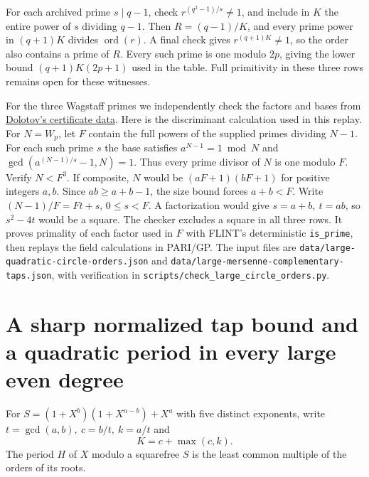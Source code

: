 \documentclass[11pt]{article}
\begin{document}
For each archived prime \(s\mid q-1\), check
\(r^{(q^2-1)/s}\ne1\), and include in \(K\) the entire power of \(s\)
dividing \(q-1\). Then \(R=(q-1)/K\), and every prime power in
\((q+1)K\) divides \(\operatorname{ord}(r)\). A final check gives
\(r^{(q+1)K}\ne1\), so the order also contains a prime of \(R\).
Every such prime is one modulo \(2p\), giving the lower bound
\((q+1)K(2p+1)\) used in the table. Full primitivity in these
three rows remains open for these witnesses.

For the three Wagstaff primes we independently check the factors
and bases from \href{https://doi.org/10.5281/zenodo.19645478}{Dolotov's
certificate data}. Here is the discriminant calculation used in
this replay. For \(N=W_p\), let \(F\) contain the full powers of
the supplied primes dividing \(N-1\). For each such prime \(s\)
the base satisfies \(a^{N-1}=1\bmod N\) and
\(\gcd(a^{(N-1)/s}-1,N)=1\). Thus every prime divisor of \(N\)
is one modulo \(F\). Verify \(N<F^3\). If composite, \(N\)
would be \((aF+1)(bF+1)\) for positive integers \(a,b\).
Since \(ab\ge a+b-1\), the size bound forces \(a+b<F\).
Write \((N-1)/F=Ft+s\), \(0\le s<F\). A factorization would
give \(s=a+b,\ t=ab\), so \(s^2-4t\) would be a square.
The checker excludes a square in all three rows. It proves primality
of each factor used in \(F\) with FLINT's deterministic
\texttt{is\_prime}, then replays the field calculations in PARI/GP.
The input files are \nolinkurl{data/large-quadratic-circle-orders.json}
and \nolinkurl{data/large-mersenne-complementary-taps.json}, with
verification in \nolinkurl{scripts/check_large_circle_orders.py}.


\section{A sharp normalized tap bound and a quadratic period in every large even degree}
\label{sec:complementary-order}

For \(S=(1+X^b)(1+X^{n-b})+X^a\) with five distinct exponents, write
\(t=\gcd(a,b),\ c=b/t,\ k=a/t\) and
\[
                         K=c+\max(c,k).
\]
The period \(H\) of \(X\) modulo a squarefree \(S\) is the least
common multiple of the orders of its roots.
\end{document}
